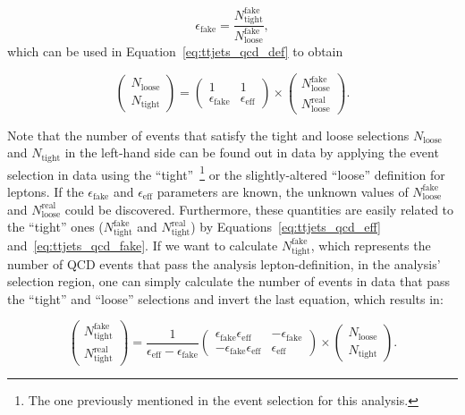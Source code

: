\begin{equation}
\displaystyle
\epsilon_{\mathrm{fake}} = \frac{N^{\mathrm{fake}}_{\mathrm{tight}}}{N^{\mathrm{fake}}_{\mathrm{loose}}},
\label{eq:ttjets_qcd_fake}
\end{equation}
which can be used in Equation~\ref{eq:ttjets_qcd_def} to obtain

\begin{equation}
\displaystyle
\begin{pmatrix}
N_{\mathrm{loose}} \\
N_{\mathrm{tight}}
\end{pmatrix}
=
\begin{pmatrix}
1 & 1 \\
\epsilon_{\mathrm{fake}} & \epsilon_{\mathrm{eff}}
\end{pmatrix}
\times
\begin{pmatrix}
N^{\mathrm{fake}}_{\mathrm{loose}} \\
N^{\mathrm{real}}_{\mathrm{loose}}
\end{pmatrix}.
\label{eq:ttjets_qcd_form}
\end{equation}

Note that the number of events that satisfy the tight and loose selections $N_{\mathrm{loose}}$ and $N_{\mathrm{tight}}$
in the left-hand side can be found out
in data by applying the event selection in data using the ``tight''~\footnote{The one previously mentioned in the
event selection for this analysis.} or the slightly-altered ``loose'' definition for leptons. If the $\epsilon_{\mathrm{fake}}$ and
$\epsilon_{\mathrm{eff}}$ parameters are known, the unknown values of $N^{\mathrm{fake}}_{\mathrm{loose}}$ and $N^{\mathrm{real}}_{\mathrm{loose}}$
could be discovered. Furthermore, these quantities are easily related to the ``tight'' ones ($N^{\mathrm{fake}}_{\mathrm{tight}}$ and
$N^{\mathrm{real}}_{\mathrm{tight}}$) by Equations~\ref{eq:ttjets_qcd_eff} and~\ref{eq:ttjets_qcd_fake}. If we want to calculate
$N^{\mathrm{fake}}_{\mathrm{tight}}$, which represents the number of QCD events that pass the analysis lepton-definition,
in the analysis' selection region, one can simply calculate the number of events in data
that pass the ``tight'' and ``loose'' selections and invert the last equation, which results in:

\begin{equation}
\displaystyle
\begin{pmatrix}
N^{\mathrm{fake}}_{\mathrm{tight}} \\
N^{\mathrm{real}}_{\mathrm{tight}}
\end{pmatrix}
=
\frac{1}{\epsilon_{\mathrm{eff}} - \epsilon_{\mathrm{fake}}}
\begin{pmatrix}
\epsilon_{\mathrm{fake}} \epsilon_{\mathrm{eff}} & - \epsilon_{\mathrm{fake}} \\
- \epsilon_{\mathrm{fake}} \epsilon_{\mathrm{eff}} & \epsilon_{\mathrm{eff}}
\end{pmatrix}
\times
\begin{pmatrix}
N_{\mathrm{loose}} \\
N_{\mathrm{tight}}
\end{pmatrix}.
\label{eq:ttjets_qcd_invform}
\end{equation}

